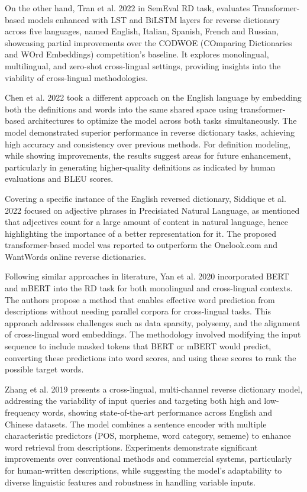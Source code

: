 \documentclass[12.5pt]{article}
\begin{document}
On the other hand, Tran et al. 2022 \cite{Tran2022} in SemEval RD task, evaluates Transformer-based models enhanced with LST and BiLSTM layers for reverse dictionary across five languages, named English, Italian, Spanish, French and Russian, showcasing partial improvements over the CODWOE (COmparing Dictionaries and WOrd Embeddings) competition's baseline. It explores monolingual, multilingual, and zero-shot cross-lingual settings, providing insights into the viability of cross-lingual methodologies.

Chen et al. 2022 \cite{Chen2022} took a different approach on the English language by embedding both the definitions and words into the same shared space using transformer-based architectures to optimize the model across both tasks simultaneously. The model demonstrated superior performance in reverse dictionary tasks, achieving high accuracy and consistency over previous methods. For definition modeling, while showing improvements, the results suggest areas for future enhancement, particularly in generating higher-quality definitions as indicated by human evaluations and BLEU scores.

Covering a specific instance of the English reversed dictionary, Siddique et al. 2022 \cite{Siddique2022} focused on adjective phrases in Precisiated Natural Language, as mentioned that adjectives count for a large amount of content in natural language, hence highlighting the importance of a better representation for it. The proposed transformer-based model was reported to outperform the Onelook.com and WantWords online reverse dictionaries.

Following similar approaches in literature, Yan et al. 2020 \cite{Yan2020} incorporated BERT and mBERT into the RD task for both monolingual and cross-lingual contexts. The authors propose a method that enables effective word prediction from descriptions without needing parallel corpora for cross-lingual tasks. This approach addresses challenges such as data sparsity, polysemy, and the alignment of cross-lingual word embeddings. The methodology involved modifying the input sequence to include masked tokens that BERT or mBERT would predict, converting these predictions into word scores, and using these scores to rank the possible target words.

Zhang et al. 2019 \cite{Zhang2019} presents a cross-lingual, multi-channel reverse dictionary model, addressing the variability of input queries and targeting both high and low-frequency words, showing state-of-the-art performance across English and Chinese datasets. The model combines a sentence encoder with multiple characteristic predictors (POS, morpheme, word category, sememe) to enhance word retrieval from descriptions. Experiments demonstrate significant improvements over conventional methods and commercial systems, particularly for human-written descriptions, while suggesting the model's adaptability to diverse linguistic features and robustness in handling variable inputs.
\end{document}
